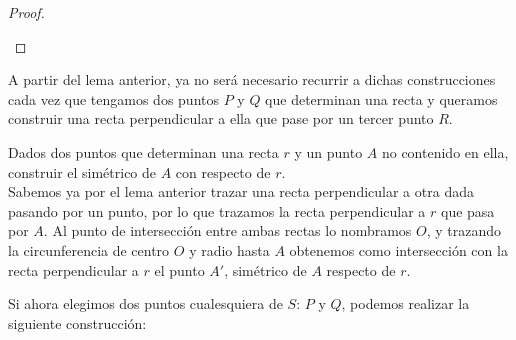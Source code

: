 \begin{lema}
\begin{proof}
\begin{description}
\begin{figure}[H]
            \end{figure}
        \end{description}
    \end{proof}
\end{lema}
A partir del lema anterior, ya no será necesario recurrir a dichas construcciones cada vez que tengamos dos puntos $P$ y $Q$ que determinan una recta y queramos construir una recta perpendicular a ella que pase por un tercer punto $R$.

\begin{ejercicio}
    Dados dos puntos que determinan una recta $r$ y un punto $A$ no contenido en ella, construir el simétrico de $A$ con respecto de $r$.\\

    \noindent
    Sabemos ya por el lema anterior trazar una recta perpendicular a otra dada pasando por un punto, por lo que trazamos la recta perpendicular a $r$ que pasa por $A$. Al punto de intersección entre ambas rectas lo nombramos $O$, y trazando la circunferencia de centro $O$ y radio hasta $A$ obtenemos como intersección con la recta perpendicular a $r$ el punto $A'$, simétrico de $A$ respecto de $r$.

    \begin{figure}[H]
        \centering
    \end{figure}
\end{ejercicio}

\noindent
Si ahora elegimos dos puntos cualesquiera de $S$: $P$ y $Q$, podemos realizar la siguiente construcción:

